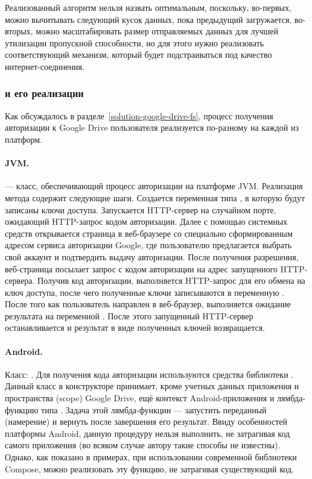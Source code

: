     Реализованный алгоритм нельзя назвать оптимальным, поскольку, во-первых, можно вычитывать следующий кусок данных, пока предыдущий загружается, во-вторых, можно масштабировать размер отправляемых данных для лучшей утилизации пропускной способности, но для этого нужно реализовать соответствующий механизм, который будет подстраиваться под качество интернет-соединения.

  \subsubsection{ и его реализации}\label{solution-details-gdrive-auth-req}
    Как обсуждалось в разделе~\ref{solution-google-drive-fs}, процесс получения авторизации к Google Drive пользователя реализуется по-разному на каждой из платформ.

    \sloppy
    \paragraph{JVM.}  --- класс, обеспечивающий процесс авторизации на платформе JVM. Реализация метода  содержит следующие шаги. Создается переменная  типа , в которую будут записаны ключи доступа. Запускается HTTP-сервер на случайном порте, ожидающий HTTP-запрос кодом авторизации. Далее с помощью системных средств открывается страница в веб-браузере со специально сформированным адресом сервиса авторизации Google, где пользователю предлагается выбрать свой аккаунт и подтвердить выдачу авторизации. После получения разрешения, веб-страница посылает запрос с кодом авторизации на адрес запущенного HTTP-сервера. Получив код авторизации, выполняется HTTP-запрос для его обмена на ключ доступа, после чего полученные ключи записываются в переменную . После того как пользователь направлен в веб-браузер, выполняется ожидание результата на переменной . После этого запущенный HTTP-сервер останавливается и результат в виде полученных ключей возвращается.

    \fussy

    \paragraph{Android.} Класс: . Для получения кода авторизации используются средства библиотеки . Данный класс в конструкторе принимает, кроме учетных данных приложения и пространства (scope) Google Drive, ещё контекст Android-приложения и лямбда-функцию типа . Задача этой лямбда-функции --- запустить переданный  (намерение) и вернуть после завершения его результат. Ввиду особенностей платформы Android, данную процедуру нельзя выполнить, не затрагивая код самого приложения (во всяком случае автору такие способы не известны). Однако, как показано в примерах, при использовании современной библиотеки Compose, можно реализовать эту функцию, не затрагивая существующий код.

